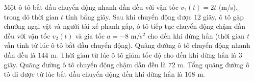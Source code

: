 \begin{ex}
Một ô tô bắt đầu chuyển động nhanh dần đều với vận tốc $v_1(t)=2t$ (m/s), trong đó thời gian $t$ tính bằng giây. Sau khi chuyển động được $12$ giây, ô tô gặp chướng ngại vật và người tài xế phanh gấp, ô tô tiếp tục chuyển động chậm dần đều với vận tốc $v_2(t)$ và gia tốc $a=-8$ m/s$^2$ cho đến khi dừng hẳn (thời gian $t$ vẫn tính từ lúc ô tô bắt đầu chuyển động).
\choiceTF
{\True Quãng đường ô tô chuyển động nhanh dần đều là $144$ m.}
{\True Thời gian từ lúc ô tô giảm tốc độ cho đến khi dừng hẳn là $3$ giây.}
{Quãng đường ô tô chuyển động chậm dần đều là $72$ m.}
{Tổng quãng đường ô tô đi được từ lúc bắt đầu chuyển động đến khi dừng hẳn là $168$ m.}
\end{ex}

